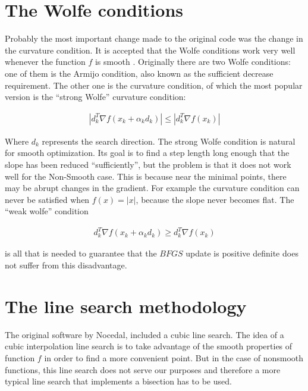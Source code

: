 \section{The Wolfe conditions}

Probably the most important change made to the original code was the change in the curvature condition. It is accepted that the Wolfe conditions work very well whenever the function $f$ is smooth \citep{MR1855221}. Originally there are two Wolfe conditions: one of them is the Armijo condition, also known as the sufficient decrease requirement. The other one is the curvature condition, of which the most popular version is the ``strong Wolfe'' curvature condition:

\begin{equation}
  \begin{aligned}
    |d_k^T \nabla f(x_k + \alpha _k d_k)| \leq |d_k^T \nabla f(x_k)|
  \end{aligned}
\end{equation}

Where $d_k$ represents the search direction. The strong Wolfe condition is natural for smooth optimization. Its goal is to find a step length long enough that the slope has been reduced ``sufficiently'', but the problem is that it does not work well for the Non-Smooth case. This is because near the minimal points, there may be abrupt changes in the gradient. For example the curvature condition can never be satisfied when $f(x) = |x|$, because the slope never becomes flat. The ``weak wolfe'' condition

\begin{equation}
  \begin{aligned}
    d_k^T \nabla f(x_k + \alpha _k d_k) \geq d_k^T \nabla f(x_k)
  \end{aligned}
\end{equation}

is all that is needed to guarantee that the $BFGS$ update is positive definite \citep{reviewthis} does not suffer from this disadvantage.

\section{The line search methodology}

The original software by Nocedal\citep{lbfgsbsoftware}, included a cubic line search. The idea of a cubic interpolation line search is to take advantage of the smooth properties of function $f$ in order to find a more convenient point. But in the case of nonsmooth functions, this line search does not serve our purposes and therefore a more typical line search that implements a bisection has to be used.

